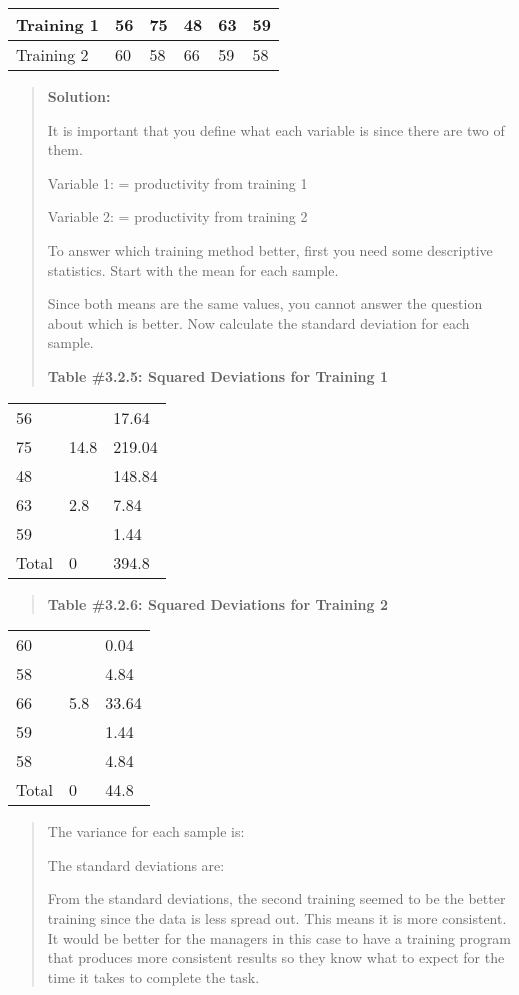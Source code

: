 \documentclass[]{book}
\begin{document}
\begin{longtable}[]{@{}llllll@{}}
\toprule
Training 1 & 56 & 75 & 48 & 63 & 59\tabularnewline
\midrule
\endhead
Training 2 & 60 & 58 & 66 & 59 & 58\tabularnewline
\bottomrule
\end{longtable}

\begin{quote}
\textbf{Solution:}

It is important that you define what each variable is since there are
two of them.

Variable 1: = productivity from training 1

Variable 2: = productivity from training 2

To answer which training method better, first you need some
descriptive statistics. Start with the mean for each sample.

Since both means are the same values, you cannot answer the question
about which is better. Now calculate the standard deviation for each
sample.

\textbf{Table \#3.2.5: Squared Deviations for Training 1}
\end{quote}

\begin{longtable}[]{@{}lll@{}}
\toprule
\endhead
56 & & 17.64\tabularnewline
75 & 14.8 & 219.04\tabularnewline
48 & & 148.84\tabularnewline
63 & 2.8 & 7.84\tabularnewline
59 & & 1.44\tabularnewline
Total & 0 & 394.8\tabularnewline
\bottomrule
\end{longtable}

\begin{quote}
\textbf{Table \#3.2.6: Squared Deviations for Training 2}
\end{quote}

\begin{longtable}[]{@{}lll@{}}
\toprule
\endhead
60 & & 0.04\tabularnewline
58 & & 4.84\tabularnewline
66 & 5.8 & 33.64\tabularnewline
59 & & 1.44\tabularnewline
58 & & 4.84\tabularnewline
Total & 0 & 44.8\tabularnewline
\bottomrule
\end{longtable}

\begin{quote}
The variance for each sample is:

The standard deviations are:

From the standard deviations, the second training seemed to be the
better training since the data is less spread out. This means it is
more consistent. It would be better for the managers in this case to
have a training program that produces more consistent results so they
know what to expect for the time it takes to complete the task.
\end{quote}
\end{document}
